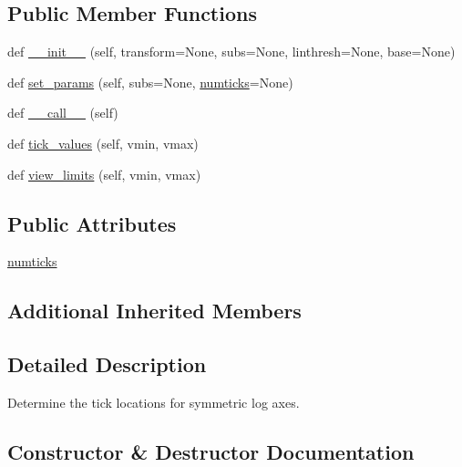 \subsection*{Public Member Functions}
\begin{DoxyCompactItemize}
\item 
def \hyperlink{classmatplotlib_1_1ticker_1_1SymmetricalLogLocator_aafb8ce6f3d466e0ffadc45d71b766e3e}{\+\_\+\+\_\+init\+\_\+\+\_\+} (self, transform=None, subs=None, linthresh=None, base=None)
\item 
def \hyperlink{classmatplotlib_1_1ticker_1_1SymmetricalLogLocator_a37a3fed790b6c545fc6a69e36257a85a}{set\+\_\+params} (self, subs=None, \hyperlink{classmatplotlib_1_1ticker_1_1SymmetricalLogLocator_a828600ede7f90b26501ad928a06732a4}{numticks}=None)
\item 
def \hyperlink{classmatplotlib_1_1ticker_1_1SymmetricalLogLocator_a9053802f4a57b25e0bb024321504660e}{\+\_\+\+\_\+call\+\_\+\+\_\+} (self)
\item 
def \hyperlink{classmatplotlib_1_1ticker_1_1SymmetricalLogLocator_af7aec103e72a968ecde1405e84c2bab8}{tick\+\_\+values} (self, vmin, vmax)
\item 
def \hyperlink{classmatplotlib_1_1ticker_1_1SymmetricalLogLocator_a84210fe9c13281045456207072037770}{view\+\_\+limits} (self, vmin, vmax)
\end{DoxyCompactItemize}
\subsection*{Public Attributes}
\begin{DoxyCompactItemize}
\item 
\hyperlink{classmatplotlib_1_1ticker_1_1SymmetricalLogLocator_a828600ede7f90b26501ad928a06732a4}{numticks}
\end{DoxyCompactItemize}
\subsection*{Additional Inherited Members}


\subsection{Detailed Description}
\begin{DoxyVerb}Determine the tick locations for symmetric log axes.
\end{DoxyVerb}
 

\subsection{Constructor \& Destructor Documentation}
\mbox{\label{classmatplotlib_1_1ticker_1_1SymmetricalLogLocator_aafb8ce6f3d466e0ffadc45d71b766e3e}} 
